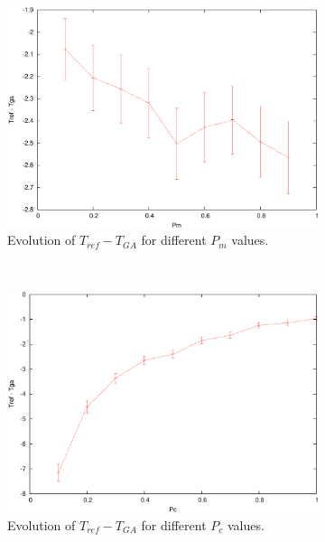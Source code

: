\documentclass[10pt,a4paper]{article}
\begin{document}
\begin{figure}[h]
\centering
\begin{subfigure}[b]{0.45\textwidth}
\centering
\includegraphics[width=\textwidth]{results_m_diff.pdf}
\caption{Evolution of $T_{ref}-T_{GA}$ for different $P_m$ values.}
\label{fig:evol_m_diff}
\end{subfigure}
~
\begin{subfigure}[b]{0.45\textwidth}
\centering
\includegraphics[width=\textwidth]{results_c_diff.pdf}
\caption{Evolution of $T_{ref}-T_{GA}$ for different $P_c$ values.}
\label{fig:evol_c_diff}
\end{subfigure}
\\
\begin{subfigure}[b]{0.45\textwidth}
\centering

\end{subfigure}
\end{figure}
\end{document}
